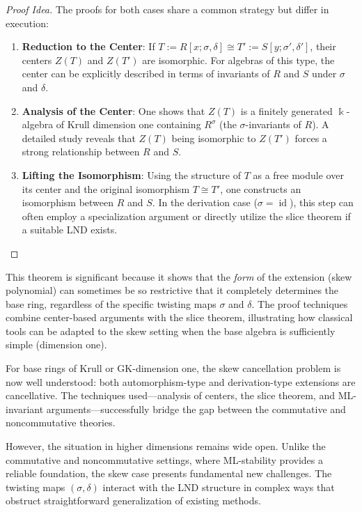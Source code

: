 \documentclass{amsart}
\theoremstyle{plain}
\numberwithin{theorem}{section}
\numberwithin{equation}{theorem}
\theoremstyle{definition}
\begin{document}
\begin{proof}[Proof Idea]
The proofs for both cases share a common strategy but differ in execution:
\begin{enumerate}
    \item \textbf{Reduction to the Center}: If $T := R[x;\sigma,\delta] \cong T' := S[y;\sigma',\delta']$, their centers $Z(T)$ and $Z(T')$ are isomorphic. For algebras of this type, the center can be explicitly described in terms of invariants of $R$ and $S$ under $\sigma$ and $\delta$.
    \item \textbf{Analysis of the Center}: One shows that $Z(T)$ is a finitely generated $\Bbbk$-algebra of Krull dimension one containing $R^\sigma$ (the $\sigma$-invariants of $R$). A detailed study reveals that $Z(T)$ being isomorphic to $Z(T')$ forces a strong relationship between $R$ and $S$.
    \item \textbf{Lifting the Isomorphism}: Using the structure of $T$ as a free module over its center and the original isomorphism $T \cong T'$, one constructs an isomorphism between $R$ and $S$. In the derivation case ($\sigma=\operatorname{id}$), this step can often employ a specialization argument or directly utilize the slice theorem if a suitable LND exists.
\end{enumerate}
\end{proof}

This theorem is significant because it shows that the \emph{form} of the 
extension (skew polynomial) can sometimes be so restrictive that it completely 
determines the base ring, regardless of the specific twisting maps $\sigma$ 
and $\delta$. The proof techniques combine center-based arguments with the 
slice theorem, illustrating how classical tools can be adapted to the skew 
setting when the base algebra is sufficiently simple (dimension one).


For base rings of Krull or GK-dimension one, the skew cancellation problem 
is now well understood: both automorphism-type and derivation-type extensions 
are cancellative. The techniques used—analysis of centers, the slice theorem, 
and ML-invariant arguments—successfully bridge the gap between the commutative 
and noncommutative theories.

However, the situation in higher dimensions remains wide open. Unlike the 
commutative and noncommutative settings, where ML-stability provides a 
reliable foundation, the skew case presents fundamental new challenges. 
The twisting maps $(\sigma,\delta)$ interact with the LND structure in 
complex ways that obstruct straightforward generalization of existing methods.
\end{document}
